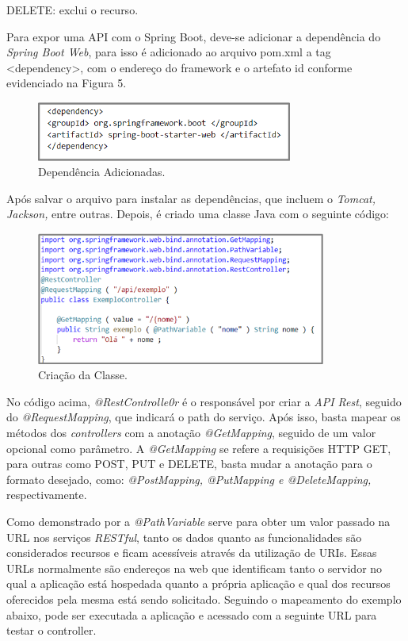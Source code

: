     DELETE: exclui o recurso.
    
    Para expor uma API com o Spring Boot, deve-se adicionar a dependência do \textit{Spring Boot Web}, para isso é adicionado ao arquivo pom.xml a tag <dependency>, com o endereço do framework e o artefato id conforme evidenciado na Figura 5.    

    \begin{figure}[h]
    \centering
    \includegraphics[width=0.75\textwidth]{./img/Dependência.png}
    \caption{Dependência Adicionadas.}
    \label{fig:Dependência}
    \end{figure}
    
    Após salvar o arquivo para instalar as dependências, que incluem o \textit{Tomcat, Jackson,} entre outras. Depois, é criado uma classe Java com o seguinte código:
    
    \begin{figure}[h]
    \centering
    \includegraphics[width=0.85\textwidth]{./img/Classe.png}
    \caption{Criação da Classe.}
    \label{fig:Classe}
    \end{figure}
    
    No código acima, \textit{@RestControlle0r} é o responsável por criar a \textit{API Rest}, seguido do \textit{@RequestMapping}, que indicará o path do serviço. Após isso, basta mapear os métodos dos \textit{controllers} com a anotação \textit{@GetMapping}, seguido de um valor opcional como parâmetro. A \textit{@GetMapping} se refere a requisições HTTP GET, para outras como POST, PUT e DELETE, basta mudar a anotação para o formato desejado, como: \textit{@PostMapping, @PutMapping e @DeleteMapping,} respectivamente.

    Como demonstrado por  a \textit{@PathVariable} serve para obter um valor passado na URL nos serviços \textit{RESTful}, tanto os dados quanto as funcionalidades são considerados recursos e ficam acessíveis através da utilização de URIs. Essas URLs normalmente são endereços na web que identificam tanto o servidor no qual a aplicação está hospedada quanto a própria aplicação e qual dos recursos oferecidos pela mesma está sendo solicitado. Seguindo o mapeamento do exemplo abaixo, pode ser executada a aplicação e acessado com a seguinte URL para testar o controller.
    
